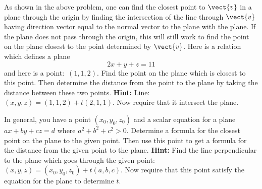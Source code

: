 \begin{enumialphparenastyle}
\begin{ex} As shown in the above problem, one can find the closest point to $\vect{v}$ in a plane through the origin by finding the intersection of the line
through $\vect{v}$ having direction vector equal to the normal vector to the
plane with the plane. If the plane does not pass through the origin, this
will still work to find the point on the plane closest to the point
determined by $\vect{v}$. Here is a relation which defines a plane 
\begin{equation*}
2x+y+z=11
\end{equation*}
and here is a point:\ $(1,1,2)$. Find the point on the plane
which is closest to this point. Then determine the distance from the point
to the plane by taking the distance between these two points. \textbf{Hint: }
Line: $(x,y,z) =(1,1,2) +t(2,1,1)$. Now
require that it intersect the plane. $\ $
\end{ex}

\begin{ex} In general, you have a point $(x_{0},y_{0},z_{0}) $ and a
scalar equation for a plane $ax+by+cz=d$ where $a^{2}+b^{2}+c^{2}>0$.
Determine a formula for the closest point on the plane to the given point.
Then use this point to get a formula for the distance from the given point
to the plane. \textbf{Hint: }Find the line perpendicular to the plane which
goes through the given point: $(x,y,z) =(
x_{0},y_{0},z_{0}) +t(a,b,c)$. Now require that this
point satisfy the equation for the plane to determine $t$.
\end{ex}

\end{enumialphparenastyle}